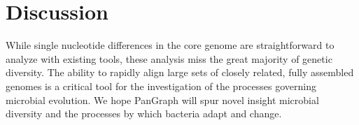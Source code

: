 \documentclass[aps,rmp,reprint,superscriptaddress,notitlepage,10pt]{revtex4-1}
\begin{document}



\section{Discussion}
While single nucleotide differences in the core genome are straightforward to analyze with existing tools, these analysis miss the great majority of genetic diversity.
The ability to rapidly align large sets of closely related, fully assembled genomes is a critical tool for the investigation of the processes governing microbial evolution.
We hope PanGraph will spur novel insight microbial diversity and the processes by which bacteria adapt and change.
\end{document}
